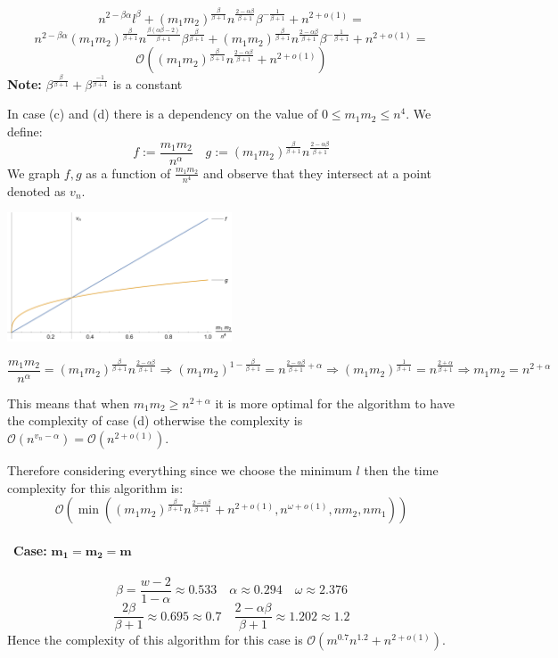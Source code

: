 \documentclass[10pt,a4paper]{article}
\begin{document}
\begin{enumerate}
\begin{enumerate}
$$
n^{2-\beta\alpha}l^\beta+(m_1m_2)^{\frac{\beta}{\beta+1}} n ^ {\frac{2 - \alpha\beta }{\beta + 1}} \beta ^{-\frac{1}{\beta + 1}} + n^{2+o(1)}=
$$
$$
n^{2-\beta\alpha} (m_1m_2)^{\frac{\beta}{\beta+1}} n ^ {\frac{\beta(\alpha\beta - 2) }{\beta + 1}} \beta ^{\frac{\beta}{\beta + 1}}  +
 (m_1m_2)^{\frac{\beta}{\beta+1}} n ^ {\frac{2-\alpha\beta}{\beta + 1}} \beta ^{-\frac{1}{\beta + 1}} + n^{2+o(1)}=
$$
$$
\mathcal{O}( (m_1m_2)^{\frac{\beta}{\beta +1}} n ^ {\frac{2 - \alpha\beta }{\beta + 1}} + n^{2+o(1)})
$$
\textbf{Note:} $\beta ^ {\frac{\beta}{\beta + 1}} + \beta ^{\frac{-1}{\beta +1}}$ is a constant
\end{enumerate}
In case (c) and (d) there is a dependency on the value of $0 \leq m_1m_2 \leq n^4$. We define:
$$f := \frac{m_1m_2}{n^\alpha} \quad g :=  (m_1m_2)^{\frac{\beta}{\beta +1}} n ^ {\frac{2 - \alpha\beta }{\beta + 1}}$$ 
We graph $f,g$ as a function of $\frac{m_1m_2}{n^4}$ and observe that they intersect at a point denoted as $v_n$.
\begin{center}
\includegraphics[width = 0.5\textwidth]{megi.pdf}
\end{center}
$$\frac{m_1m_2}{n^\alpha} = (m_1m_2)^{\frac{\beta}{\beta +1}} n ^ {\frac{2 - \alpha\beta }{\beta + 1}} \Longrightarrow  (m_1m_2)^{1-\frac{\beta}{\beta + 1}} = n^{\frac{2-\alpha\beta}{\beta + 1} + \alpha}\Longrightarrow (m_1m_2)^{\frac{1}{\beta +1}} = n^{\frac{2+\alpha}{\beta + 1}} \Longrightarrow m_1m_2 = n^{2 + \alpha} $$

This means that when $m_1m_2 \geq n^{2+\alpha}$ it is more optimal for the algorithm to have the complexity of case (d) otherwise the complexity is $\mathcal{O}(n^{v_n-\alpha}) = \mathcal{O}(n^{2+o(1)})$. \\
\end{enumerate}
Therefore considering everything since we choose the minimum $l$ then the time complexity for this algorithm is: $$\mathcal{O}\left(\min \left((m_1m_2)^{\frac{\beta}{\beta +1}} n ^ {\frac{2 - \alpha\beta }{\beta + 1}} + n^{2+o(1)}, n^{\omega+o(1)}, nm_2, nm_1 \right)\right) $$\\\
\textbf{Case: }$\mathbf{m_1 = m_2 = m}$\\\\
$$
\beta = \frac{w - 2}{1 - \alpha} \approx 0.533 \quad \alpha \approx 0.294 \quad \omega \approx 2.376
$$
$$
\frac{2\beta}{\beta + 1} \approx 0.695 \approx 0.7 \quad \frac{2-\alpha\beta} {\beta + 1} \approx 1.202 \approx 1.2
$$
Hence the complexity of this algorithm for this case is $\mathcal{O}(m^{0.7}n^{1.2} + n^{2+o(1)})$.
\end{document}
